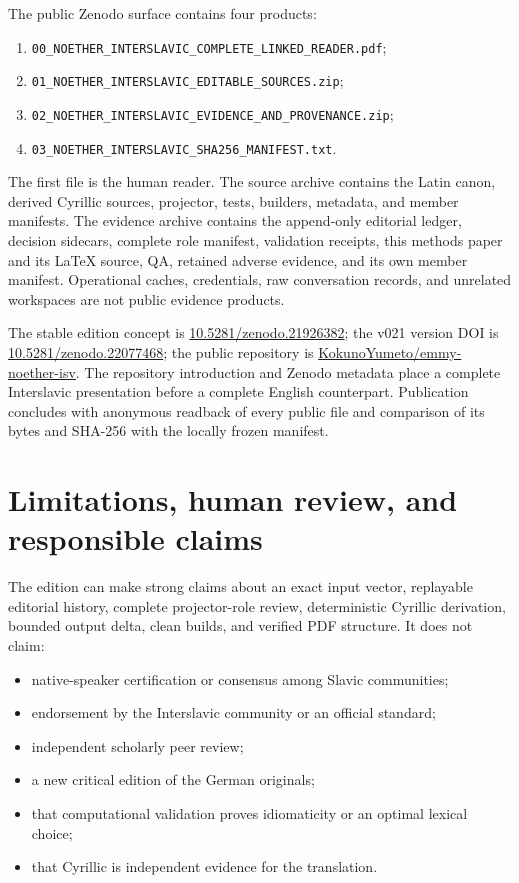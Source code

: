 \documentclass[11pt]{article}
\newcommand{\code}[1]{\texttt{#1}}
\newcommand{\doiurl}[1]{\href{https://doi.org/#1}{#1}}
\newcommand{\repo}{\href{https://github.com/KokunoYumeto/emmy-noether-isv}{KokunoYumeto/emmy-noether-isv}}
\begin{document}
The public Zenodo surface contains four products:

\begin{enumerate}
\item \code{00\_NOETHER\_INTERSLAVIC\_COMPLETE\_LINKED\_READER.pdf};
\item \code{01\_NOETHER\_INTERSLAVIC\_EDITABLE\_SOURCES.zip};
\item \code{02\_NOETHER\_INTERSLAVIC\_EVIDENCE\_AND\_PROVENANCE.zip};
\item \code{03\_NOETHER\_INTERSLAVIC\_SHA256\_MANIFEST.txt}.
\end{enumerate}

The first file is the human reader. The source archive contains the Latin canon, derived Cyrillic sources, projector, tests, builders, metadata, and member manifests. The evidence archive contains the append-only editorial ledger, decision sidecars, complete role manifest, validation receipts, this methods paper and its LaTeX source, QA, retained adverse evidence, and its own member manifest. Operational caches, credentials, raw conversation records, and unrelated workspaces are not public evidence products.

The stable edition concept is \doiurl{10.5281/zenodo.21926382}; the v021 version DOI is \doiurl{10.5281/zenodo.22077468}; the public repository is \repo. The repository introduction and Zenodo metadata place a complete Interslavic presentation before a complete English counterpart. Publication concludes with anonymous readback of every public file and comparison of its bytes and SHA-256 with the locally frozen manifest.

\section{Limitations, human review, and responsible claims}

The edition can make strong claims about an exact input vector, replayable editorial history, complete projector-role review, deterministic Cyrillic derivation, bounded output delta, clean builds, and verified PDF structure. It does not claim:

\begin{itemize}
\item native-speaker certification or consensus among Slavic communities;
\item endorsement by the Interslavic community or an official standard;
\item independent scholarly peer review;
\item a new critical edition of the German originals;
\item that computational validation proves idiomaticity or an optimal lexical choice;
\item that Cyrillic is independent evidence for the translation.
\end{itemize}
\end{document}
